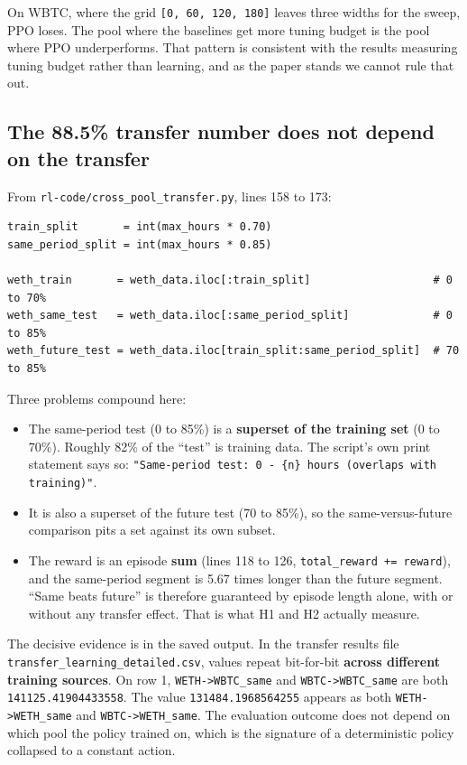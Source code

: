 \documentclass[11pt,a4paper]{article}
\newcommand{\code}[1]{\texttt{\small #1}}
\begin{document}
On WBTC, where the grid \code{[0, 60, 120, 180]} leaves three widths for the sweep, PPO loses. The
pool where the baselines get more tuning budget is the pool where PPO underperforms. That pattern
is consistent with the results measuring tuning budget rather than learning, and as the paper
stands we cannot rule that out.

\subsection{The 88.5\% transfer number does not depend on the transfer}

From \code{rl-code/cross\_pool\_transfer.py}, lines 158 to 173:

\begin{lstlisting}[basicstyle=\ttfamily\scriptsize]
train_split       = int(max_hours * 0.70)
same_period_split = int(max_hours * 0.85)

weth_train       = weth_data.iloc[:train_split]                   # 0 to 70%
weth_same_test   = weth_data.iloc[:same_period_split]             # 0 to 85%
weth_future_test = weth_data.iloc[train_split:same_period_split]  # 70 to 85%
\end{lstlisting}

Three problems compound here:

\begin{itemize}
  \item The same-period test (0 to 85\%) is a \textbf{superset of the training set} (0 to 70\%).
        Roughly 82\% of the ``test'' is training data. The script's own print statement says so:
        \code{"Same-period test: 0 - \{n\} hours (overlaps with training)"}.
  \item It is also a superset of the future test (70 to 85\%), so the same-versus-future
        comparison pits a set against its own subset.
  \item The reward is an episode \textbf{sum} (lines 118 to 126, \code{total\_reward += reward}),
        and the same-period segment is 5.67 times longer than the future segment. ``Same beats
        future'' is therefore guaranteed by episode length alone, with or without any transfer
        effect. That is what H1 and H2 actually measure.
\end{itemize}

The decisive evidence is in the saved output. In the transfer results file
\code{transfer\_learning\_detailed.csv}, values repeat
bit-for-bit \textbf{across different training sources}. On row 1, \code{WETH->WBTC\_same} and
\code{WBTC->WBTC\_same} are both \code{141125.41904433558}. The value \code{131484.1968564255}
appears as both \code{WETH->WETH\_same} and \code{WBTC->WETH\_same}. The evaluation outcome does
not depend on which pool the policy trained on, which is the signature of a deterministic policy
collapsed to a constant action.
\end{document}

